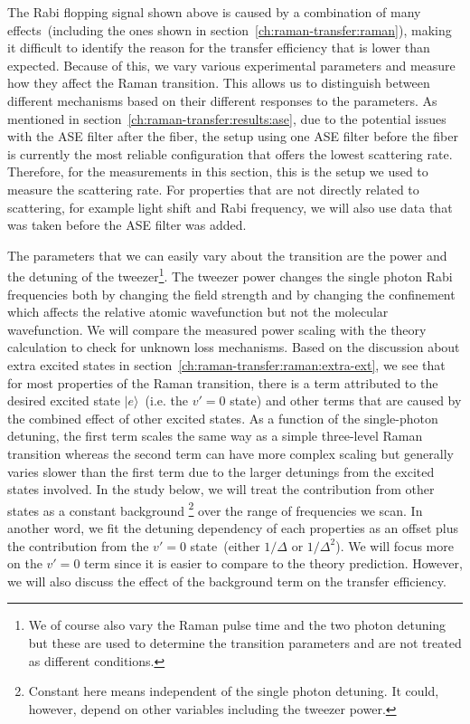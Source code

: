 The Rabi flopping signal shown above is caused by a combination of
many effects~(including the ones shown in section~\ref{ch:raman-transfer:raman}),
making it difficult to identify the reason for the transfer efficiency
that is lower than expected.
Because of this, we vary various experimental parameters
and measure how they affect the Raman transition.
This allows us to distinguish between different mechanisms based
on their different responses to the parameters.
As mentioned in section~\ref{ch:raman-transfer:results:ase},
due to the potential issues with the ASE filter after the fiber,
the setup using one ASE filter before the fiber is currently the most reliable configuration
that offers the lowest scattering rate.
Therefore, for the measurements in this section,
this is the setup we used to measure the scattering rate.
For properties that are not directly related to scattering,
for example light shift and Rabi frequency,
we will also use data that was taken before the ASE filter was added.

The parameters that we can easily vary about the transition
are the power and the detuning of the tweezer\footnote{
  We of course also vary the Raman pulse time and the two photon detuning
  but these are used to determine the transition parameters
  and are not treated as different conditions.}.
The tweezer power changes the single photon Rabi frequencies
both by changing the field strength and by changing the confinement
which affects the relative atomic wavefunction but not the molecular wavefunction.
We will compare the measured power scaling with the theory calculation
to check for unknown loss mechanisms.
Based on the discussion about extra excited states
in section~\ref{ch:raman-transfer:raman:extra-ext},
we see that for most properties of the Raman transition,
there is a term attributed to
the desired excited state $|e\rangle$~(i.e. the $v'=0$ state)
and other terms that are caused by the combined effect of other excited states.
As a function of the single-photon detuning,
the first term scales the same way as a simple three-level Raman transition
whereas the second term can have more complex scaling but generally varies slower
than the first term due to the larger detunings from the excited states involved.
In the study below, we will treat the contribution from other states as a constant background
\footnote{Constant here means independent of the single photon detuning.
  It could, however, depend on other variables including the tweezer power.}
over the range of frequencies we scan.
In another word, we fit the detuning dependency of each properties
as an offset plus the contribution from the $v'=0$ state~(either $1/\Delta$ or $1/\Delta^2$).
We will focus more on the $v'=0$ term since it is easier to compare to the theory prediction.
However, we will also discuss the effect of the background term on the transfer efficiency.

